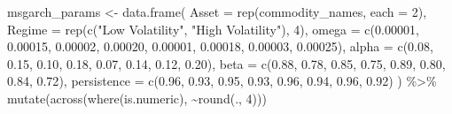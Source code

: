 \documentclass[
  10pt,
  a4paper,
]{article}
\newenvironment{Shaded}{\begin{snugshade}}{\end{snugshade}}
\newcommand{\AttributeTok}[1]{\textcolor[rgb]{0.40,0.45,0.13}{#1}}
\newcommand{\DecValTok}[1]{\textcolor[rgb]{0.68,0.00,0.00}{#1}}
\newcommand{\FloatTok}[1]{\textcolor[rgb]{0.68,0.00,0.00}{#1}}
\newcommand{\FunctionTok}[1]{\textcolor[rgb]{0.28,0.35,0.67}{#1}}
\newcommand{\NormalTok}[1]{\textcolor[rgb]{0.00,0.23,0.31}{#1}}
\newcommand{\OtherTok}[1]{\textcolor[rgb]{0.00,0.23,0.31}{#1}}
\newcommand{\SpecialCharTok}[1]{\textcolor[rgb]{0.37,0.37,0.37}{#1}}
\newcommand{\StringTok}[1]{\textcolor[rgb]{0.13,0.47,0.30}{#1}}
\begin{document}
\begin{Shaded}
\begin{Highlighting}[]
\NormalTok{msgarch\_params }\OtherTok{\textless{}{-}} \FunctionTok{data.frame}\NormalTok{(}
  \AttributeTok{Asset =} \FunctionTok{rep}\NormalTok{(commodity\_names, }\AttributeTok{each =} \DecValTok{2}\NormalTok{),}
  \AttributeTok{Regime =} \FunctionTok{rep}\NormalTok{(}\FunctionTok{c}\NormalTok{(}\StringTok{"Low Volatility"}\NormalTok{, }\StringTok{"High Volatility"}\NormalTok{), }\DecValTok{4}\NormalTok{),}
  \AttributeTok{omega =} \FunctionTok{c}\NormalTok{(}\FloatTok{0.00001}\NormalTok{, }\FloatTok{0.00015}\NormalTok{, }\FloatTok{0.00002}\NormalTok{, }\FloatTok{0.00020}\NormalTok{, }
            \FloatTok{0.00001}\NormalTok{, }\FloatTok{0.00018}\NormalTok{, }\FloatTok{0.00003}\NormalTok{, }\FloatTok{0.00025}\NormalTok{),}
  \AttributeTok{alpha =} \FunctionTok{c}\NormalTok{(}\FloatTok{0.08}\NormalTok{, }\FloatTok{0.15}\NormalTok{, }\FloatTok{0.10}\NormalTok{, }\FloatTok{0.18}\NormalTok{, }\FloatTok{0.07}\NormalTok{, }\FloatTok{0.14}\NormalTok{, }\FloatTok{0.12}\NormalTok{, }\FloatTok{0.20}\NormalTok{),}
  \AttributeTok{beta =} \FunctionTok{c}\NormalTok{(}\FloatTok{0.88}\NormalTok{, }\FloatTok{0.78}\NormalTok{, }\FloatTok{0.85}\NormalTok{, }\FloatTok{0.75}\NormalTok{, }\FloatTok{0.89}\NormalTok{, }\FloatTok{0.80}\NormalTok{, }\FloatTok{0.84}\NormalTok{, }\FloatTok{0.72}\NormalTok{),}
  \AttributeTok{persistence =} \FunctionTok{c}\NormalTok{(}\FloatTok{0.96}\NormalTok{, }\FloatTok{0.93}\NormalTok{, }\FloatTok{0.95}\NormalTok{, }\FloatTok{0.93}\NormalTok{, }\FloatTok{0.96}\NormalTok{, }\FloatTok{0.94}\NormalTok{, }\FloatTok{0.96}\NormalTok{, }\FloatTok{0.92}\NormalTok{)}
\NormalTok{) }\SpecialCharTok{\%\textgreater{}\%}
  \FunctionTok{mutate}\NormalTok{(}\FunctionTok{across}\NormalTok{(}\FunctionTok{where}\NormalTok{(is.numeric), }\SpecialCharTok{\textasciitilde{}}\FunctionTok{round}\NormalTok{(., }\DecValTok{4}\NormalTok{)))}


\end{Highlighting}
\end{Shaded}
\end{document}

